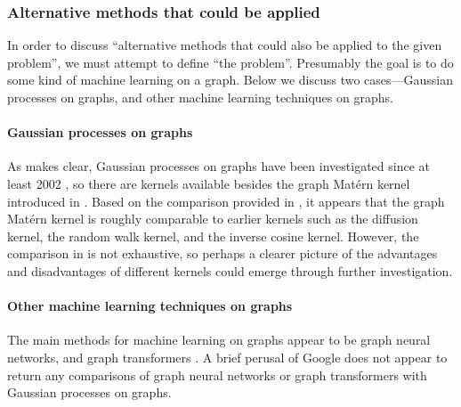 \subsubsection{Alternative methods that could be applied}


In order to discuss ``alternative methods that could also be applied to the given problem'', we must attempt to define ``the problem''. Presumably the goal is to do some kind of machine learning on a graph. Below we discuss two cases---Gaussian processes on graphs, and other machine learning techniques on graphs.

\paragraph{Gaussian processes on graphs} As \cite{pmlr-v130-borovitskiy21a} makes clear, Gaussian processes on graphs have been investigated since at least 2002 \cite{kondor2002diffusion}, so there are kernels available besides the graph Mat\'{e}rn kernel introduced in \cite{pmlr-v130-borovitskiy21a}. Based on the comparison provided in \cite{pmlr-v130-borovitskiy21a}, it appears that the graph Mat\'{e}rn kernel is roughly comparable to earlier kernels such as the diffusion kernel, the random walk kernel, and the inverse cosine kernel. However, the comparison in \cite{pmlr-v130-borovitskiy21a} is not exhaustive, so perhaps a clearer picture of the advantages and disadvantages of different kernels could emerge through further investigation.

\paragraph{Other machine learning techniques on graphs} The main methods for machine learning on graphs appear to be graph neural networks, and graph transformers \cite{huggraph, stangraph}. A brief perusal of Google does not appear to return any comparisons of graph neural networks or graph transformers with Gaussian processes on graphs.


